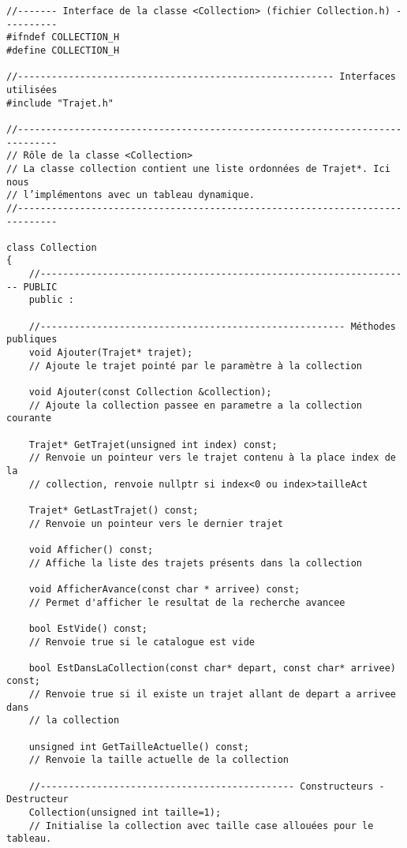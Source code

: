 \begin{verbatim}
//------- Interface de la classe <Collection> (fichier Collection.h) ----------
#ifndef COLLECTION_H
#define COLLECTION_H

//-------------------------------------------------------- Interfaces utilisées
#include "Trajet.h"

//-----------------------------------------------------------------------------
// Rôle de la classe <Collection>
// La classe collection contient une liste ordonnées de Trajet*. Ici nous
// l’implémentons avec un tableau dynamique.
//-----------------------------------------------------------------------------

class Collection
{
    //------------------------------------------------------------------ PUBLIC
    public :
    
    //------------------------------------------------------ Méthodes publiques
    void Ajouter(Trajet* trajet);
    // Ajoute le trajet pointé par le paramètre à la collection

    void Ajouter(const Collection &collection);
    // Ajoute la collection passee en parametre a la collection courante
    
    Trajet* GetTrajet(unsigned int index) const;
    // Renvoie un pointeur vers le trajet contenu à la place index de la
    // collection, renvoie nullptr si index<0 ou index>tailleAct
    
    Trajet* GetLastTrajet() const;
    // Renvoie un pointeur vers le dernier trajet
    
    void Afficher() const;
    // Affiche la liste des trajets présents dans la collection

    void AfficherAvance(const char * arrivee) const;
    // Permet d'afficher le resultat de la recherche avancee
    
    bool EstVide() const;
    // Renvoie true si le catalogue est vide

    bool EstDansLaCollection(const char* depart, const char* arrivee) const;
    // Renvoie true si il existe un trajet allant de depart a arrivee dans
    // la collection
    
    unsigned int GetTailleActuelle() const;
    // Renvoie la taille actuelle de la collection
    
    //--------------------------------------------- Constructeurs - Destructeur
    Collection(unsigned int taille=1);
    // Initialise la collection avec taille case allouées pour le tableau.
    

\end{verbatim}
